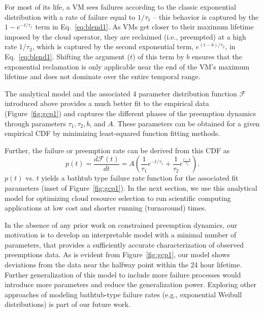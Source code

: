 For most of its life, a VM sees failures according to the classic exponential distribution with a rate of failure equal to $1/\tau_1$ -- this behavior is captured by the $1-e^{-t/\tau_1}$ term in Eq.~\ref{eq:blend1}. 
As VMs get closer to their maximum lifetime imposed by the cloud operator, they are reclaimed (i.e., preempted) at a high rate $1/\tau_2$, which is captured by the second exponential term, $e^{(t-b)/\tau_2}$, in Eq.~\ref{eq:blend1}. 
Shifting the argument ($t$) of this term by $b$ ensures that the exponential reclamation is only applicable near the end of the VM's maximum lifetime and does not dominate over the entire temporal range. 

The analytical model and the associated 4 parameter distribution function $\mathscr{F}$ introduced above provides a much better fit to the empirical data (Figure~\ref{fig:gcp1}) and captures the different phases of the preemption dynamics through parameters $\tau_1, \tau_2, b$, and $A$. These parameters can be obtained for a given empirical CDF by minimizing least-squared function fitting methods.

%
%

Further, the failure or preemption rate can be derived from this CDF as 
\begin{equation}
\label{eq:failrate}
p(t) = \dfrac{d \mathscr{F}(t)} {dt} = A \left(\dfrac{1}{\tau_1}e^{-t/\tau_1} + \dfrac{1}{\tau_2}e^{\frac{t-b}{\tau_2}}\right).
\end{equation}
$p(t)$ vs. $t$ yields a bathtub type failure rate function for the associated fit parameters (inset of Figure~\ref{fig:gcp1}).
In the next section, we use this analytical model for optimizing cloud resource selection to run scientific computing applications at low cost and shorter running (turnaround) times.

In the absence of any prior work on constrained preemption dynamics, our motivation is to develop an interpretable model with a minimal number of parameters, that provides a sufficiently accurate characterization of observed preemptions data. 
As is evident from Figure~\ref{fig:gcp1}, our model shows deviations from the data near the halfway point within the 24 hour lifetime. 
Further generalization of this model to include more failure processes would introduce more parameters and reduce the generalization power.
Exploring other approaches of modeling bathtub-type failure rates (e.g., exponential Weibull distributions) \cite{mudholkar1993exponentiated,crevecoeur1993model} is part of our future work. 


